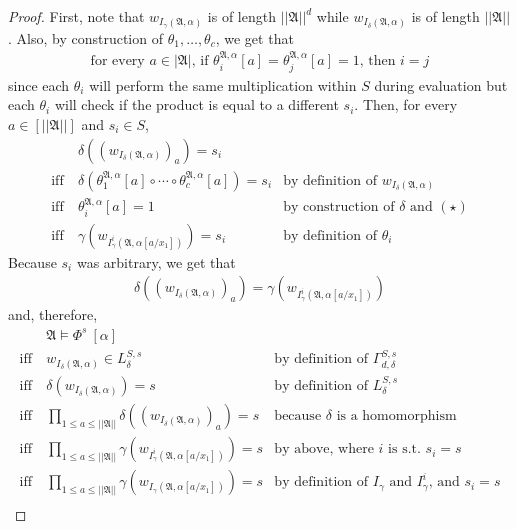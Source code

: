 \documentclass[a4paper,UKenglish,cleveref, autoref, thm-restate, anonymous]{lipics-v2021}
\begin{document}
\begin{proof}
    First, note that $w_{I_\gamma(\mathfrak{A},\alpha)}$ is of length $||\mathfrak{A}||^d$ while $w_{I_\delta(\mathfrak{A},\alpha)}$ is of length $||\mathfrak{A}||$. Also, by construction of $\theta_1, \dots, \theta_c$, we get that \begin{align*}
        \text{for every $a \in |\mathfrak{A}|$, if $\theta_i^{\mathfrak{A},\alpha}[a] = \theta_j^{\mathfrak{A},\alpha}[a] = 1$, then $i = j$}\tag{$\star$}
    \end{align*} since each $\theta_i$ will perform the same multiplication within $S$ during evaluation but each $\theta_i$ will check if the product is equal to a different $s_i$. Then, for every $a \in [||\mathfrak{A}||]$ and $s_i \in S$,
    \begin{align*}
        &\delta((w_{I_\delta(\mathfrak{A},\alpha)})_a) = s_i \\
        \text{iff}\ &\delta(\theta_1^{\mathfrak{A},\alpha}[a]\circ \cdots\circ \theta_c^{\mathfrak{A},\alpha}[a]) = s_i &\text{by definition of $w_{I_\delta(\mathfrak{A},\alpha)}$}\\
        \text{iff}\ &\theta_i^{\mathfrak{A},\alpha}[a] = 1 &\text{by construction of $\delta$ and $(\star)$}\\
        \text{iff}\ &\gamma(w_{I^i_\gamma(\mathfrak{A},\alpha[a/x_1])}) = s_i&\text{by definition of $\theta_i$}
    \end{align*}
    Because $s_i$ was arbitrary, we get that
    \begin{align*}
        \delta((w_{I_\delta(\mathfrak{A},\alpha)})_a) = \gamma(w_{I^i_\gamma(\mathfrak{A},\alpha[a/x_1])})
    \end{align*}
    and, therefore,
    \begin{align*}
        &\mathfrak{A} \models \Phi^s\ [\alpha]\\
        \text{iff}\ &w_{I_\delta(\mathfrak{A},\alpha)} \in L^{S,s}_\delta &\text{by definition of $\Gamma^{S,s}_{d,\delta}$}\\
        \text{iff}\ &\delta(w_{I_\delta(\mathfrak{A},\alpha)}) = s &\text{by definition of $L^{S,s}_\delta$}\\
        \text{iff}\ &\prod_{1 \leq a \leq ||\mathfrak{A}||} \delta((w_{I_\delta(\mathfrak{A},\alpha)})_a) = s &\text{because $\delta$ is a homomorphism}\\
        \text{iff}\ &\prod_{1 \leq a \leq ||\mathfrak{A}||} \gamma(w_{I^i_\gamma(\mathfrak{A},\alpha[a/x_1])}) = s &\text{by above, where $i$ is s.t. $s_i = s$}\\
        \text{iff}\ &\prod_{1 \leq a \leq ||\mathfrak{A}||} \gamma(w_{I_\gamma(\mathfrak{A},\alpha[a/x_1])}) = s&\text{by definition of $I_\gamma$ and $I^i_\gamma$, and $s_i = s$}\\

\end{align*}
\end{proof}
\end{document}
